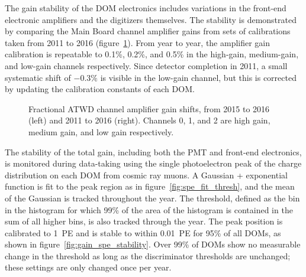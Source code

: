 The gain stability of the DOM electronics includes variations in the
front-end electronic amplifiers and the digitizers themselves.  The
stability is demonstrated by comparing the Main Board channel amplifier gains
from sets of calibrations taken from 2011 to 2016
(figure~\ref{fig:domcal_ch_gain}).  From year to year, the amplifier gain 
calibration is repeatable to 0.1\%, 0.2\%, and 0.5\% in the high-gain,
medium-gain, and low-gain channels respectively.  Since detector completion
in 2011, a small systematic shift of $-0.3\%$ is visible in the low-gain
channel, but this is corrected by updating the calibration constants of
each DOM.

\begin{figure}[!h]
  \captionsetup[subfigure]{labelformat=empty}
  \centering
  \caption{Fractional ATWD channel amplifier gain shifts, from 2015 to
    2016 (left) and 2011 to 2016 (right).  Channels 0, 1, and 2 are
    high gain, medium gain, and low gain respectively.}
  \label{fig:domcal_ch_gain}
\end{figure}

The stability of the total gain, including both the PMT and
front-end electronics, is monitored during data-taking using the
single photoelectron peak of the charge distribution on each DOM from
cosmic ray muons. A
Gaussian + exponential function is fit to the peak region as in
figure~\ref{fig:spe_fit_thresh}, and the mean of the Gaussian is
tracked throughout the year. The threshold, defined as the bin in the histogram for which 99\% of the area of the histogram is contained in the sum of all higher bins, is also tracked through
the year. The peak position is calibrated to 1~PE
and is stable to within 0.01~PE for 95\% of all DOMs, as shown in
figure~\ref{fig:gain_spe_stability}. Over 99\% of DOMs show no
measurable change in the threshold as long as the discriminator
thresholds are unchanged; these settings are only changed once per year.

